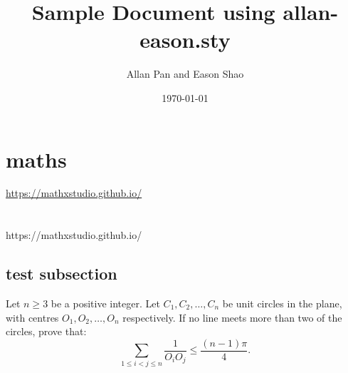\documentclass{article}
\title{Sample Document using allan-eason.sty}
\author{Allan Pan and Eason Shao}
\date{\today}
\begin{document}
    \maketitle
    \newpage
    \tableofcontents
    \newpage

    \section{maths}
        \url{https://mathxstudio.github.io/} \\
         \\
         \\
        https://mathxstudio.github.io/
        \subsection{test subsection}
        Let \(n\geq 3\) be a positive integer. Let \(C_1,C_2,\ldots,C_n\) be unit circles in the plane, with centres \(O_1,O_2,\ldots,O_n\) respectively. If no line meets more than two of the circles, prove that:
        \[\sum\limits_{1\leq i<j\leq n}\dfrac{1}{O_iO_j}\leq \dfrac{(n-1)\pi}{4}.\]
\end{document}
